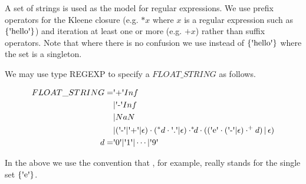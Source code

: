 \documentclass[runningheads,12pt]{article}
\begin{document}
A set of strings is used as the model for regular expressions. We use prefix operators for the Kleene closure (e.g. $*x$ where $x$ is a regular expression such as $\{\squote{hello}\}$) and iteration at least one or more (e.g. $\textrm{+}x$) rather than suffix operators. Note that where there is no confusion we use  instead of $\{\squote{hello}\}$ where the set is a singleton. 

We may use type REGEXP to specify a $FLOAT\_STRING$ as follows.

\begin{align}
FLOAT\_STRING = &\squote{+}Inf\\
&|\squote{-}Inf\\
&|NaN\\
&|(\squote{-}|\squote{+}|\epsilon)\cdot(^*d\cdot\squote{.}|\epsilon)\cdot
	^*\!\!d\cdot ((\squote{e}\cdot(\squote{-}|\epsilon)\cdot^\textrm{+}d)\,|\,\epsilon)\\
d = &\squote{0} | \squote{1} | \cdots |\squote{9} 
\end{align}

In the above we use the convention that , for example, really stands for the single set $\{\squote{e}\}$.


\end{document}
